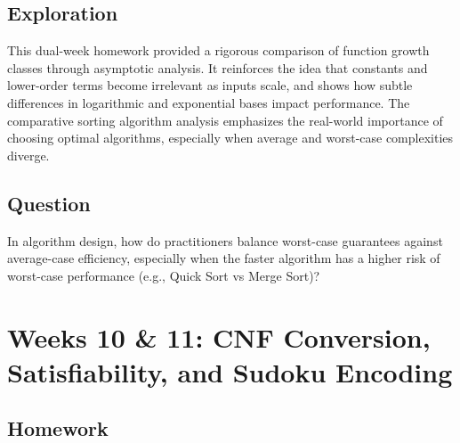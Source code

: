 \documentclass[11pt]{article}
\begin{document}
\subsection{Exploration}

This dual-week homework provided a rigorous comparison of function growth classes through asymptotic analysis. It reinforces the idea that constants and lower-order terms become irrelevant as inputs scale, and shows how subtle differences in logarithmic and exponential bases impact performance. The comparative sorting algorithm analysis emphasizes the real-world importance of choosing optimal algorithms, especially when average and worst-case complexities diverge.

\subsection{Question}

In algorithm design, how do practitioners balance worst-case guarantees against average-case efficiency, especially when the faster algorithm has a higher risk of worst-case performance (e.g., Quick Sort vs Merge Sort)?

\section{Weeks 10 \& 11: CNF Conversion, Satisfiability, and Sudoku Encoding}

\subsection{Homework}
\end{document}
